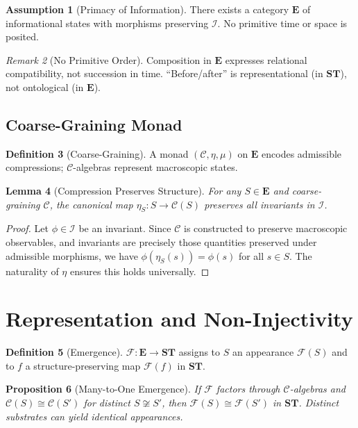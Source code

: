 \documentclass[11pt]{article}
\theoremstyle{definition}
\newtheorem{definition}{Definition}[section]
\newtheorem{assumption}[definition]{Assumption}
\theoremstyle{plain}
\newtheorem{lemma}[definition]{Lemma}
\newtheorem{proposition}[definition]{Proposition}
\theoremstyle{remark}
\newtheorem{remark}[definition]{Remark}
\newcommand{\Ecat}{\mathbf{E}}      %
\newcommand{\ST}{\mathbf{ST}}       %
\newcommand{\F}{\mathcal{F}}        %
\newcommand{\I}{\mathcal{I}}        %
\newcommand{\C}{\mathcal{C}}        %
\begin{document}
\begin{assumption}[Primacy of Information]
There exists a category $\Ecat$ of informational states with morphisms preserving $\I$. No primitive time or space is posited.
\end{assumption}

\begin{remark}[No Primitive Order]
Composition in $\Ecat$ expresses relational compatibility, not succession in time. ``Before/after'' is representational (in $\ST$), not ontological (in $\Ecat$).
\end{remark}

\subsection{Coarse-Graining Monad}
\begin{definition}[Coarse-Graining]
A monad $(\C,\eta,\mu)$ on $\Ecat$ encodes admissible compressions; $\C$-algebras represent macroscopic states.
\end{definition}

\begin{lemma}[Compression Preserves Structure]
For any $S \in \Ecat$ and coarse-graining $\C$, the canonical map $\eta_S: S \to \C(S)$ preserves all invariants in $\I$.
\end{lemma}

\begin{proof}
Let $\phi \in \I$ be an invariant. Since $\C$ is constructed to preserve macroscopic observables, and invariants are precisely those quantities preserved under admissible morphisms, we have $\phi(\eta_S(s)) = \phi(s)$ for all $s \in S$. The naturality of $\eta$ ensures this holds universally.
\end{proof}

\section{Representation and Non-Injectivity}
\begin{definition}[Emergence]
$\F:\Ecat\to\ST$ assigns to $S$ an appearance $\F(S)$ and to $f$ a structure-preserving map $\F(f)$ in $\ST$.
\end{definition}

\begin{proposition}[Many-to-One Emergence]
If $\F$ factors through $\C$-algebras and $\C(S)\cong\C(S')$ for distinct $S\not\cong S'$, then $\F(S)\cong \F(S')$ in $\ST$. Distinct substrates can yield identical appearances.
\end{proposition}
\end{document}
